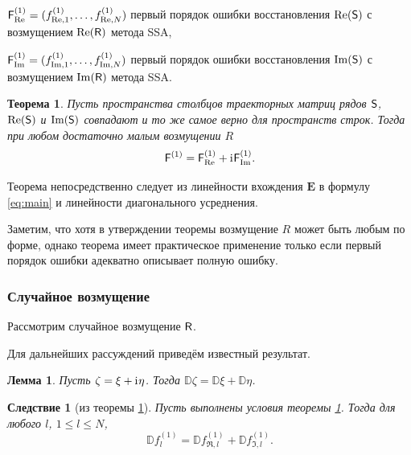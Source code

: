 \documentclass[12pt,a4paper]{article}
\newtheorem{corollary}{Следствие}%
\newtheorem{theorem}{Теорема}%
\newtheorem{lemma}{Лемма}%
\begin{document}
$\textsf{F}^{(1)}_{\Re} = (f^{(1)}_{\Re,1}, \ldots, f^{(1)}_{\Re, N})$ первый порядок ошибки восстановления $\Re(\textsf{S})$ с возмущением $\Re(\textsf{R})$ метода SSA,

$\textsf{F}^{(1)}_{\Im} = (f^{(1)}_{\Im,1}, \ldots, f^{(1)}_{\Im, N})$ первый порядок ошибки восстановления $\Im(\textsf{S})$ с возмущением $\Im(\textsf{R})$ метода SSA.


\begin{theorem}\label{th:sum}
Пусть пространства столбцов траекторных матриц рядов $\textsf{S}$, $\Re(\textsf{S})$ и $\Im(\textsf{S})$ совпадают и то же самое верно для пространств строк.
Тогда при любом достаточно малым возмущении $R$ $$\textsf{F}^{(1)} = \textsf{F}^{(1)}_{\Re} + \mathrm{i}\mkern1mu\textsf{F}^{(1)}_{\Im}.$$
\end{theorem}

Теорема непосредственно следует из линейности вхождения $\mathbf{E}$ в формулу \eqref{eq:main} и линейности диагонального усреднения.

Заметим, что хотя в утверждении теоремы возмущение $R$ может быть любым по форме, однако теорема имеет практическое применение только если первый порядок ошибки адекватно описывает полную ошибку.

\subsubsection{Случайное возмущение}

Рассмотрим случайное возмущение $\textsf{R}$.

Для дальнейших рассуждений приведём известный результат.
\begin{lemma} \label{std:disp}
Пусть $\zeta = \xi + \mathrm{i}\mkern1mu\eta$. Тогда $\mathbb{D}\zeta = \mathbb{D}\xi + \mathbb{D}\eta$.
\end{lemma}

\begin{corollary}[из теоремы {\ref{th:sum}}] \label{st:dispsum}
	Пусть выполнены условия теоремы \ref{th:sum}.
	Тогда для любого $l$, $1\le l \le N$,
	\begin{equation} \label{eq:dispsum}
		\mathbb{D}f^{(1)}_l = \mathbb{D}f^{(1)}_{\Re, l} + \mathbb{D}f^{(1)}_{\Im, l}.	
	\end{equation}
\end{corollary}
\end{document}
